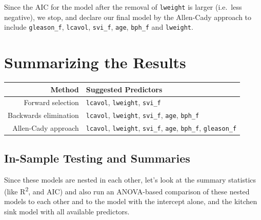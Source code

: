 \documentclass[]{book}
\theoremstyle{definition}
\theoremstyle{definition}
\theoremstyle{definition}
\theoremstyle{remark}
\begin{document}
Since the AIC for the model after the removal of \texttt{lweight} is
larger (i.e.~less negative), we stop, and declare our final model by the
Allen-Cady approach to include \texttt{gleason\_f}, \texttt{lcavol},
\texttt{svi\_f}, \texttt{age}, \texttt{bph\_f} and \texttt{lweight}.

\section{Summarizing the Results}\label{summarizing-the-results}

\begin{longtable}[]{@{}rl@{}}
\toprule
Method & Suggested Predictors\tabularnewline
\midrule
\endhead
Forward selection & \texttt{lcavol}, \texttt{lweight},
\texttt{svi\_f}\tabularnewline
Backwards elimination & \texttt{lcavol}, \texttt{lweight},
\texttt{svi\_f}, \texttt{age}, \texttt{bph\_f}\tabularnewline
Allen-Cady approach & \texttt{lcavol}, \texttt{lweight},
\texttt{svi\_f}, \texttt{age}, \texttt{bph\_f},
\texttt{gleason\_f}\tabularnewline
\bottomrule
\end{longtable}

\subsection{In-Sample Testing and
Summaries}\label{in-sample-testing-and-summaries}

Since these models are nested in each other, let's look at the summary
statistics (like R\textsuperscript{2}, and AIC) and also run an
ANOVA-based comparison of these nested models to each other and to the
model with the intercept alone, and the kitchen sink model with all
available predictors.
\end{document}
